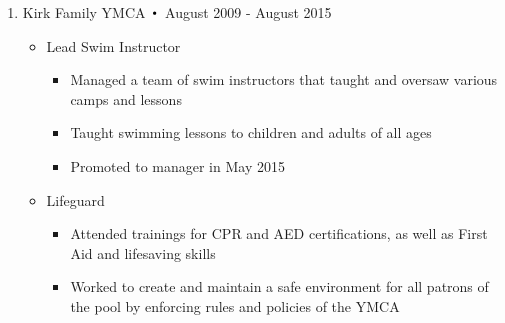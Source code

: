 \begin{enumerate}[label={\Roman*}.]
\newpage
\item Kirk Family YMCA $\Bigcdot$ August 2009 - August 2015
\begin{itemize}
\item Lead Swim Instructor
\begin{itemize}
\item Managed a team of swim instructors that taught and oversaw various camps and lessons
\item Taught swimming lessons to children and adults of all ages
\item Promoted to manager in May 2015
\end{itemize}
\item Lifeguard
\begin{itemize}
\item Attended trainings for CPR and AED certifications, as well as First Aid and lifesaving skills
\item Worked to create and maintain a safe environment for all patrons of the pool by enforcing rules and
policies of the YMCA
\end{itemize}
\end{itemize}
\end{enumerate}
